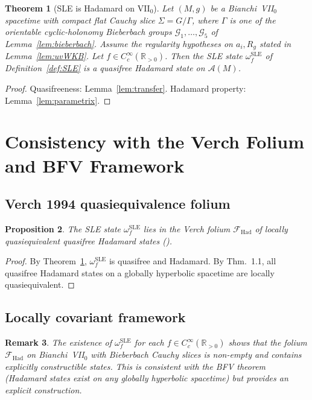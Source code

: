 \documentclass[12pt, a4paper]{article}
\newtheorem{theorem}{Theorem}[section]
\newtheorem{proposition}[theorem]{Proposition}
\newtheorem{remark}[theorem]{Remark}
\theoremstyle{remark}
\newcommand{\bR}{\mathbb{R}}
\newcommand{\cA}{\mathcal{A}}
\newcommand{\SLE}{\mathrm{SLE}}
\begin{document}
\begin{theorem}[SLE is Hadamard on VII$_0$]\label{thm:main}
  Let $(M,g)$ be a Bianchi~VII$_0$ spacetime with compact flat Cauchy
  slice $\Sigma = G/\Gamma$, where $\Gamma$ is one of the orientable
  cyclic-holonomy Bieberbach groups
  $\mathcal{G}_1,\dots,\mathcal{G}_5$ of Lemma~\ref{lem:bieberbach}.
  Assume the regularity hypotheses on $a_i, R_g$ stated in
  Lemma~\ref{lem:uvWKB}.  Let $f \in C_c^\infty(\bR_{>0})$.  Then the SLE
  state $\omega_f^{\SLE}$ of Definition~\ref{def:SLE} is a quasifree
  Hadamard state on $\cA(M)$.
\end{theorem}

\begin{proof}
  Quasifreeness: Lemma~\ref{lem:transfer}.
  Hadamard property: Lemma~\ref{lem:parametrix}.
\end{proof}

\section{Consistency with the Verch Folium and BFV Framework}\label{sec:folium}

\subsection{Verch 1994 quasiequivalence folium}

\begin{proposition}\label{prop:folium}
  The SLE state $\omega_f^{\SLE}$ lies in the Verch folium
  $\mathcal{F}_{\mathrm{Had}}$ of locally quasiequivalent quasifree
  Hadamard states (\cite{Ver94}).
\end{proposition}

\begin{proof}
  By Theorem~\ref{thm:main}, $\omega_f^{\SLE}$ is quasifree and Hadamard.
  By \cite{Ver94} Thm.~1.1, all quasifree Hadamard states on a globally
  hyperbolic spacetime are locally quasiequivalent.
\end{proof}

\subsection{Locally covariant framework}

\begin{remark}
  The existence of $\omega_f^{\SLE}$ for each $f \in C_c^\infty(\bR_{>0})$
  shows that the folium $\mathcal{F}_{\mathrm{Had}}$ on Bianchi~VII$_0$
  with Bieberbach Cauchy slices is non-empty and contains explicitly
  constructible states.  This is consistent with the BFV theorem
  \cite{BFV03} (Hadamard states exist on any globally hyperbolic
  spacetime) but provides an \emph{explicit} construction.
\end{remark}
\end{document}
